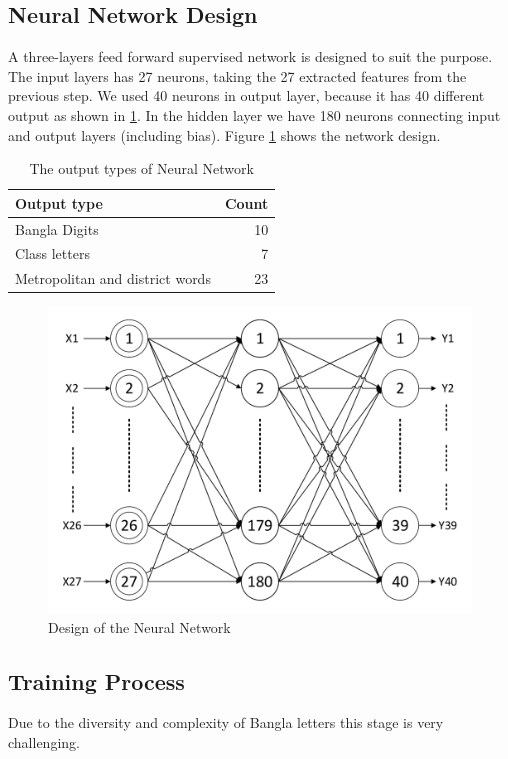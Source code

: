 \documentclass{standalone}
\begin{document}
\subsection{Neural Network Design}
A three-layers feed forward supervised network is designed to suit the purpose. The input layers has 27 neurons, taking the 27 extracted features from the previous step. We used 40 neurons in output layer, because it has 40 different output as shown in \ref{table:OutputTypes}. In the hidden layer we have 180 neurons connecting input and output layers (including bias). Figure \ref{fig:PerceptronModel} shows the network design.

\begin{table}
\centering
\caption{The output types of Neural Network}
\label{table:OutputTypes}
\begin{tabular}{|l|r|}
\hline
Output type & Count  \\
\hline
Bangla Digits   & 10 \\
Class letters   & 7  \\
Metropolitan and district words  & 23 \\
\hline
\end{tabular}
\end{table}

\begin{figure}[]
     \centering
     \includegraphics[width=0.8\linewidth]{./img/plots/neural}
     \caption{Design of the Neural Network}
     \label{fig:PerceptronModel}
\end{figure}



\subsection{Training Process}
Due to the diversity and complexity of Bangla letters this stage is very challenging.
\end{document}
